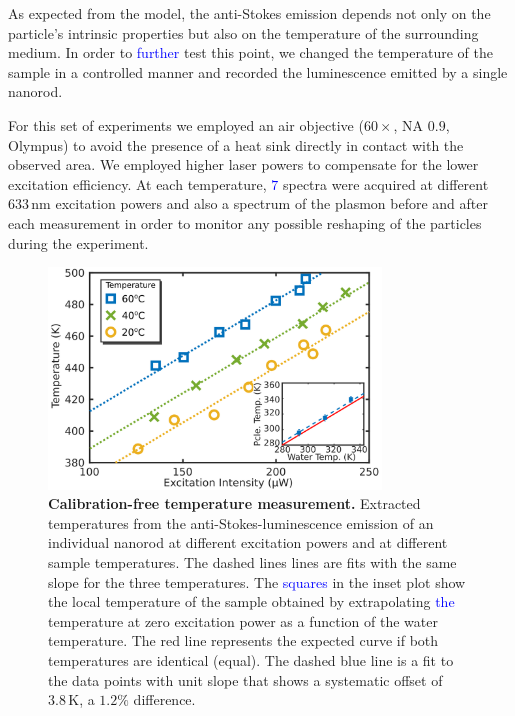 \documentclass[journal=nalefd,manuscript=letter]{achemso}
\newcommand{\HI}[1]{\textcolor{blue}{#1}} %
\newcommand{\K}{\ensuremath{\,\textrm{K}}}
\newcommand{\nm}{\ensuremath{\,\textrm{nm}}}
\begin{document}
As expected from the model, the anti-Stokes emission depends not only on
the particle's intrinsic properties but also on the temperature of the
surrounding medium\cite{Konrad2013}. In order to \HI{further} test this point, we changed the
temperature of the sample in a controlled manner and recorded the luminescence
emitted by a single nanorod.

For this set of experiments we employed an air objective ($60\times$, NA $0.9$,
Olympus) to avoid the presence of a heat sink directly in contact with the
observed area. We employed higher laser powers to compensate for the lower
excitation efficiency. At each temperature, \HI{$7$} spectra were acquired at different
$633\nm$ excitation powers and also a spectrum of the plasmon before and after
each measurement in order to monitor any possible reshaping of the particles
during the experiment.

\begin{figure}[tp] \centering
\includegraphics[width=88.4mm]{Figures/03_Fit_Of_AS/03_Log_Fit_AS_02.png}
\caption{\textbf{Calibration-free temperature measurement.}
Extracted temperatures from the anti-Stokes-luminescence emission of an individual nanorod
at different excitation powers and at different sample temperatures. 
The dashed lines lines are fits with the same slope for the three temperatures. 
The \HI{squares} in the inset plot show the local temperature of the sample obtained
by extrapolating \HI{the} temperature at zero excitation power as a function of the water temperature.
The red line represents the expected curve if both temperatures are identical (equal). The dashed blue
line is a fit to the data points with unit slope that shows a systematic offset of $3.8\K$, a $1.2\%$ difference.}
	\label{fig:AS_temp}
\end{figure}

\end{document}
